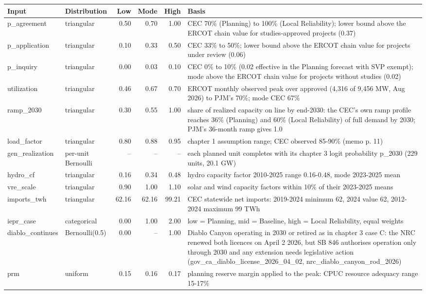 \begin{tabular}{llrrrp{7.2cm}}
\toprule
Input & Distribution & Low & Mode & High & Basis \\
\midrule
p\_agreement & triangular & 0.50 & 0.70 & 1.00 & CEC 70\% (Planning) to 100\% (Local Reliability); lower bound above the ERCOT chain value for studies-approved projects (0.37) \\
p\_application & triangular & 0.10 & 0.33 & 0.50 & CEC 33\% to 50\%; lower bound above the ERCOT chain value for projects under review (0.06) \\
p\_inquiry & triangular & 0.00 & 0.03 & 0.10 & CEC 0\% to 10\% (0.02 effective in the Planning forecast with SVP exempt); mode above the ERCOT chain value for projects without studies (0.02) \\
utilization & triangular & 0.46 & 0.67 & 0.70 & ERCOT monthly observed peak over approved (4,316 of 9,456 MW, Aug 2026) to PJM's 70\%; mode CEC 67\% \\
ramp\_2030 & triangular & 0.30 & 0.55 & 1.00 & share of realized capacity on line by end-2030: the CEC's own ramp profile reaches 36\% (Planning) and 60\% (Local Reliability) of full demand by 2030; PJM's 36-month ramp gives 1.0 \\
load\_factor & triangular & 0.80 & 0.88 & 0.95 & chapter 1 assumption range; CEC observed 85-90\% (memo p. 11) \\
gen\_realization & per-unit Bernoulli & -- & -- & -- & each planned unit completes with its chapter 3 logit probability p\_2030 (229 units, 20.1 GW) \\
hydro\_cf & triangular & 0.16 & 0.34 & 0.48 & hydro capacity factor 2010-2025 range 0.16-0.48, mode 2023-2025 mean \\
vre\_scale & triangular & 0.90 & 1.00 & 1.10 & solar and wind capacity factors within 10\% of their 2023-2025 means \\
imports\_twh & triangular & 62.16 & 62.16 & 99.21 & CEC statewide net imports: 2019-2024 minimum 62, 2024 value 62, 2012-2024 maximum 99 TWh \\
iepr\_case & categorical & 0.00 & 1.00 & 2.00 & low = Planning, mid = Baseline, high = Local Reliability, equal weights \\
diablo\_continues & Bernoulli(0.5) & 0.00 & -- & 1.00 & Diablo Canyon operating in 2030 or retired as in chapter 3 case C: the NRC renewed both licences on April 2 2026, but SB 846 authorises operation only through 2030 and any extension needs legislative action (gov\_ca\_diablo\_license\_2026\_04\_02, nrc\_diablo\_canyon\_rod\_2026) \\
prm & uniform & 0.15 & 0.16 & 0.17 & planning reserve margin applied to the peak: CPUC resource adequacy range 15-17\% \\
\bottomrule
\end{tabular}